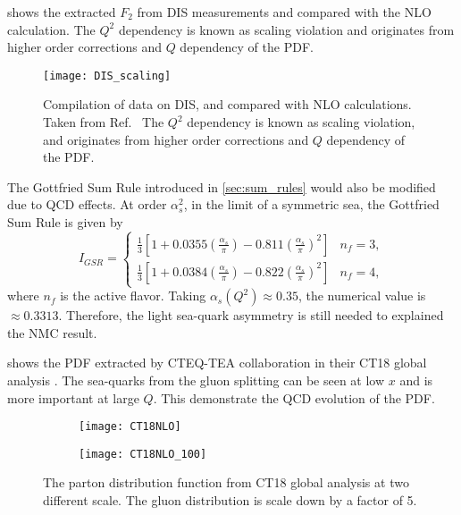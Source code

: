 \documentclass[../main.tex]{subfiles}
\begin{document}
 shows the extracted $F_2$ from DIS measurements and compared
with the NLO calculation. The $Q^2$ dependency is known as scaling violation and
originates from higher order corrections and $Q$ dependency of the PDF.
\begin{figure}[h!]
	\centering
	\texttt{[image: DIS\_scaling]}
	\caption{
		Compilation of data on DIS, and compared with NLO calculations.
		Taken from Ref.~\cite{theh1collaboration2003}
		The $Q^2$ dependency is known as scaling violation,
		and originates from higher order corrections and $Q$ dependency of the PDF.
	}
	\label{fig:DIS_scaling}
\end{figure}
The Gottfried Sum Rule introduced in \cref{sec:sum_rules} would also be modified due to
QCD effects. At order $\alpha_s^2$, in the limit of a symmetric sea, the Gottfried Sum Rule
is given by \cite{kataev2003}
\begin{equation}
	I_{GSR} = \begin{cases}
		\frac{1}{3}\left[ 1 + 0.0355\left(\frac{\alpha_s}{\pi}\right)-0.811\left(\frac{\alpha_s}{\pi}\right)^2 \right] & n_f=3, \\
		\frac{1}{3}\left[ 1 + 0.0384\left(\frac{\alpha_s}{\pi}\right)-0.822\left(\frac{\alpha_s}{\pi}\right)^2 \right] & n_f=4,
	\end{cases}
\end{equation}
where $n_f$ is the active flavor.
Taking $\alpha_s(Q^2)\approx 0.35$, the numerical value is $\approx 0.3313$. Therefore,
the light sea-quark asymmetry is still needed to explained the NMC result.

 shows the PDF extracted by CTEQ-TEA collaboration in their
CT18 global analysis \cite{hou2021}. The sea-quarks from the gluon splitting
can be seen at low $x$ and is more important at large $Q$. This demonstrate the
QCD evolution of the PDF.

\begin{figure}
	\centering
	\begin{subfigure}{0.45\linewidth}
		\texttt{[image: CT18NLO]}
	\end{subfigure}
	\begin{subfigure}{0.45\linewidth}
		\texttt{[image: CT18NLO\_100]}
	\end{subfigure}
	\caption{The parton distribution function from CT18 \cite{hou2021} global analysis at two different scale.
		The gluon distribution is scale down by a factor of 5.}
	\label{fig:CT18_scale}
\end{figure}
\end{document}
